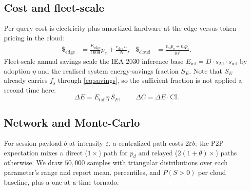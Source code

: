 \documentclass[conference]{IEEEtran}
\newcommand{\fs}{f_{s}}
\begin{document}
\subsection{Cost and fleet-scale}
Per-query cost is electricity plus amortized hardware at the edge versus token
pricing in the cloud:
\begin{align}
\$_{\text{edge}}&=\tfrac{E_{\text{edge}}}{1000}p_{e}+\tfrac{c_{\text{dev}}\,a}{N},&
\$_{\text{cloud}}&=\tfrac{n_o p_{o}+n_i p_{i}}{10^6}.
\end{align}
Fleet-scale annual savings scale the IEA 2030 inference base
$E_{\text{inf}}=D\cdot s_{\text{AI}}\cdot s_{\text{inf}}$ by adoption $\eta$ and
the realised system energy-savings fraction $S_E$. Note that $S_E$ already
carries $\fs$ through \eqref{eq:savings}, so the sufficient fraction is not
applied a second time here:
\begin{equation}
\Delta E = E_{\text{inf}}\,\eta\,S_E,\qquad
\Delta C = \Delta E\cdot \mathrm{CI}.
\end{equation}

\subsection{Network and Monte-Carlo}
For session payload $b$ at intensity $\varepsilon$, a centralized path costs
$2\varepsilon b$; the P2P expectation mixes a direct ($1\times$) path for $p_d$
and relayed ($2(1{+}\theta)\times$) paths otherwise. We draw $50{,}000$ samples
with triangular distributions over each parameter's range and report mean,
percentiles, and $P(S>0)$ per cloud baseline, plus a one-at-a-time tornado.
\end{document}
